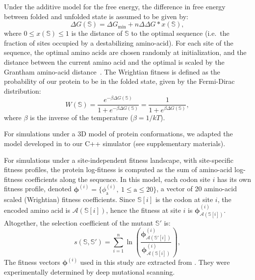 \documentclass[authoryear]{elsarticle} %
\newcommand{\UniDimArray}[1]{\bm{#1}} %
\newcommand{\aminoacid}{\text{a}} %
\newcommand{\aaMap}{\mathcal{A}} %
\newcommand{\wrightfit}{W} %
\newcommand{\profile}{\phi} %
\newcommand{\Profile}{\UniDimArray{\profile}} %
\newcommand{\NbrSites}{n} %
\newcommand{\G}{G} %
\newcommand{\DeltaG}{\Delta \G} %
\newcommand{\EmpiricalDeltaDeltaG}{\Delta \DeltaG} %
\newcommand{\EmpiricalDeltaGmin}{\DeltaG_{\text{min}}} %
\newcommand{\Seqi}{\mathbb{S}} %
\newcommand{\Seqj}{\mathbb{S}'} %
\begin{document}
Under the additive model for the free energy, the difference in free energy between folded and unfolded state is assumed to be given by:
\begin{equation*}
    \DeltaG\left(\Seqi\right) = \EmpiricalDeltaGmin + \NbrSites \EmpiricalDeltaDeltaG * x\left(\Seqi\right),
\end{equation*}
where $0 \leq x\left(\Seqi\right) \leq 1$ is the distance of $\Seqi$ to the optimal sequence (i.e.~the fraction of sites occupied by a destabilizing amino-acid).
For each site of the sequence, the optimal amino acids are chosen randomly at initialization, and the distance between the current amino acid and the optimal is scaled by the Grantham amino-acid distance~\citep{Grantham1974}.
The Wrightian fitness is defined as the probability of our protein to be in the folded state, given by the Fermi-Dirac distribution:
\begin{equation}
    \wrightfit (\Seqi) = \dfrac{e^{-\beta \DeltaG\left(\Seqi\right) }}{1 + e^{-\beta \DeltaG\left(\Seqi\right) }} = \dfrac{1}{1 + e^{\beta \DeltaG\left(\Seqi\right) }},
\end{equation}
where $\beta$ is the inverse of the temperature ($\beta=1/kT$).

For simulations under a 3D model of protein conformations, we adapted the model developed in \citet{Goldstein2017} to our C++ simulator (see  supplementary materials).

For simulations under a site-independent fitness landscape, with site-specific fitness profiles, the protein log-fitness is computed as the sum of amino-acid log-fitness coefficients along the sequence.
In this model, each {codon} site $i$ has its own fitness profile, denoted $\Profile^{(i)} = \{ \profile^{(i)}_{\aminoacid},\ 1 \leq \aminoacid \leq 20 \}$, a vector of 20 amino-acid scaled (Wrightian) fitness coefficients.
Since $\Seqi[ i ]$ is the {codon} at site $i$, the encoded amino acid is $\aaMap \left( \Seqi[ i ] \right)$, hence the fitness at site $i$ is $\Profile^{(i)}_{\aaMap \left( \Seqi[ i ] \right)}$.
Altogether, the selection coefficient of the mutant $\Seqj$ is:
\begin{equation}
    s \left( \Seqi,\Seqj\right) = \sum\limits_{ i = 1 }^{\NbrSites} \ln \left( \dfrac{\Profile^{(i)}_{\aaMap \left( \Seqj[ i ] \right)}}{\Profile^{(i)}_{\aaMap \left( \Seqi[ i ] \right)}} \right),
\end{equation}
The fitness vectors $\Profile^{(i)}$ used in this study are extracted from \citet{Bloom2017}.
They were experimentally determined by deep mutational scanning.
\end{document}
